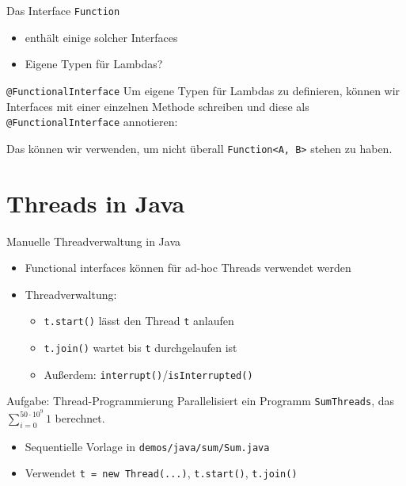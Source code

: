 \documentclass{beamer}
\newcommand{\code}[1]{
	\begin{mdframed}
		
	\end{mdframed}
}
\begin{document}
\begin{frame}{Das Interface \texttt{Function}}
  \code{code/function.java}

  \begin{itemize}
    \item {} enthält einige solcher Interfaces
    \item Eigene Typen für Lambdas?
  \end{itemize}
\end{frame}

\begin{frame}{\texttt{@FunctionalInterface}}
  Um eigene Typen für Lambdas zu definieren, können wir Interfaces mit einer einzelnen Methode schreiben und diese als \texttt{@FunctionalInterface} annotieren:

  \code{code/myfuncinterface.java}

  Das können wir verwenden, um nicht überall \texttt{Function<A, B>} stehen zu haben.
\end{frame}

\section{Threads in Java}

\begin{frame}{Manuelle Threadverwaltung in Java}
  \code{code/runnable.java}

  \begin{itemize}
    \item Functional interfaces können für ad-hoc Threads verwendet werden
    \item Threadverwaltung:
    \begin{itemize}
      \item \texttt{t.start()} lässt den Thread \texttt{t} anlaufen
      \item \texttt{t.join()} wartet bis \texttt{t} durchgelaufen ist
      \item Außerdem: \texttt{interrupt()}/\texttt{isInterrupted()}
    \end{itemize}
  \end{itemize}
\end{frame}

\begin{frame}{Aufgabe: Thread-Programmierung}
    Parallelisiert ein Programm \texttt{SumThreads}, das $\sum^{50 \cdot 10^9}_{i = 0} 1$ berechnet.

    \begin{itemize}
        \item Sequentielle Vorlage in \texttt{demos/java/sum/Sum.java}
        \item Verwendet \texttt{t = new Thread(...)}, \texttt{t.start()}, \texttt{t.join()}
    \end{itemize}
\end{frame}
\end{document}
